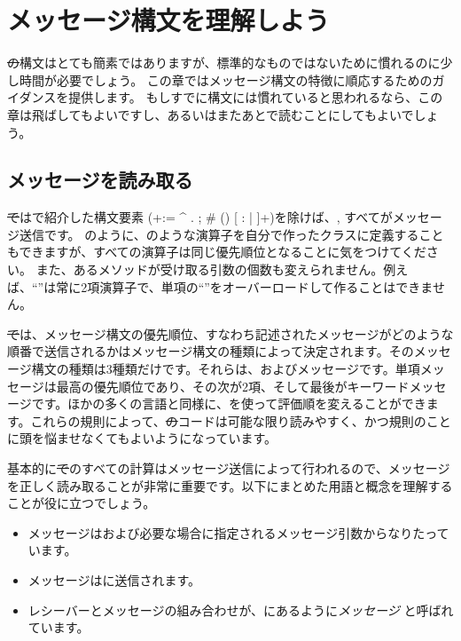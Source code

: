 \documentclass[a4paper,10pt,twoside]{book}
\begin{document}
	\renewcommand{\nnbb}[2]{} %
	\sloppy
\fi
\chapter{メッセージ構文を理解しよう}

\st の構文はとても簡素ではありますが、標準的なものではないために慣れるのに少し時間が必要でしょう。
この章ではメッセージ構文の特徴に順応するためのガイダンスを提供します。
もしすでに構文には慣れていると思われるなら、この章は飛ばしてもよいですし、あるいはまたあとで読むことにしてもよいでしょう。

\section{メッセージを読み取る}

\st ではで紹介した構文要素 (\ct+:= ^ . ; # () {} [ : | ]+)を除けば、, すべてがメッセージ送信です。
のように、\ct{+}のような演算子を自分で作ったクラスに定義することもできますが、すべての演算子は同じ優先順位となることに気をつけてください。
また、あるメソッドが受け取る引数の個数も変えられません。例えば、``\ct{-}''は常に2項演算子で、単項の``\ct{-}''をオーバーロードして作ることはできません。

\st では、メッセージ構文の優先順位、すなわち記述されたメッセージがどのような順番で送信されるかはメッセージ構文の種類によって決定されます。そのメッセージ構文の種類は3種類だけです。それらは、およびメッセージです。単項メッセージは最高の優先順位であり、その次が2項、そして最後がキーワードメッセージです。ほかの多くの言語と同様に、を使って評価順を変えることができます。これらの規則によって、\st のコードは可能な限り読みやすく、かつ規則のことに頭を悩ませなくてもよいようになっています。

基本的に\st でのすべての計算はメッセージ送信によって行われるので、メッセージを正しく読み取ることが非常に重要です。以下にまとめた用語と概念を理解することが役に立つでしょう。

\begin{itemize}
  \item メッセージはおよび必要な場合に指定されるメッセージ引数からなりたっています。
  \item メッセージはに送信されます。
  \item レシーバーとメッセージの組み合わせが、にあるように\emph{メッセージ} と呼ばれています。
\end{itemize}
\end{document}
